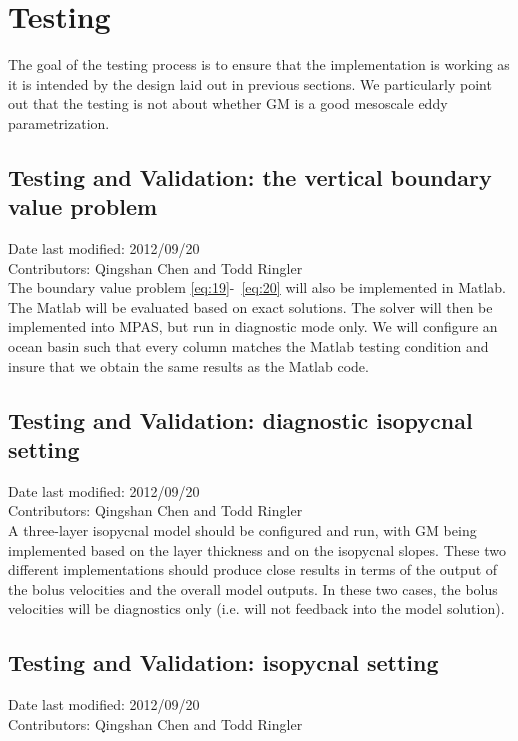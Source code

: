 \documentclass[12pt]{report}
\begin{document}

\chapter{Testing}\label{cha:testing}
The goal of the testing process is to ensure that the implementation
is working as it is intended by the design laid out in previous
sections. We particularly point out that the testing is not about
whether GM is a good mesoscale eddy parametrization.

\section{Testing and Validation: the vertical boundary value problem}
Date last modified: 2012/09/20 \\
Contributors: Qingshan Chen and Todd Ringler\\

The boundary value problem \eqref{eq:19}-~\eqref{eq:20} will also be
implemented in Matlab. The Matlab will be evaluated based on exact solutions. The solver will then be implemented into MPAS, but run in diagnostic mode only. We will configure an ocean basin such that every column matches the Matlab testing condition and insure that we obtain the same results as the Matlab code.

\section{Testing and Validation: diagnostic isopycnal setting}
Date last modified: 2012/09/20 \\
Contributors: Qingshan Chen and Todd Ringler\\

A three-layer isopycnal model should be configured and run, with GM
being implemented based on the layer thickness and on the isopycnal
slopes. These two different implementations should produce close
results in terms of the output of the bolus velocities and the
overall model outputs. In these two cases, the bolus velocities will be diagnostics only (i.e. will not feedback into the model solution).

\section{Testing and Validation: isopycnal setting}
Date last modified: 2012/09/20 \\
Contributors: Qingshan Chen and Todd Ringler\\
\end{document}

